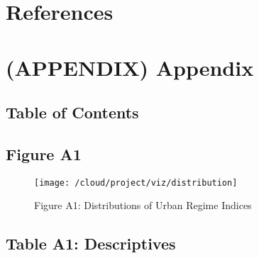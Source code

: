 \documentclass[preprint, 3p,
authoryear]{elsarticle} %
\newlength{\cslhangindent}
\newlength{\cslentryspacingunit} %
\newenvironment{CSLReferences}[2] %
 {%
  \setlength{\parindent}{0pt}
  \ifodd #1
  \let\oldpar\par
  \def\par{\hangindent=\cslhangindent\oldpar}
  \fi
  \setlength{\parskip}{#2\cslentryspacingunit}
 }%
 {}
\begin{document}
\singlespacing

\hypertarget{references}{%
\section*{References}\label{references}}

\hypertarget{refs}{}
\begin{CSLReferences}{0}{0}
\end{CSLReferences}

\hypertarget{appendix-appendix}{%
\section*{(APPENDIX) Appendix}\label{appendix-appendix}}

\hypertarget{table-of-contents}{%
\subsection{Table of Contents}\label{table-of-contents}}

\newpage

\hypertarget{figure_A1}{%
\subsection{Figure A1}\label{figure_A1}}

\begin{figure}
\texttt{[image: /cloud/project/viz/distribution]} \caption{Figure A1: Distributions of Urban Regime Indices}\label{fig:figure_A1}
\end{figure}

\newpage

\hypertarget{table-a1-descriptives}{%
\subsection{Table A1: Descriptives}\label{table-a1-descriptives}}
\end{document}
